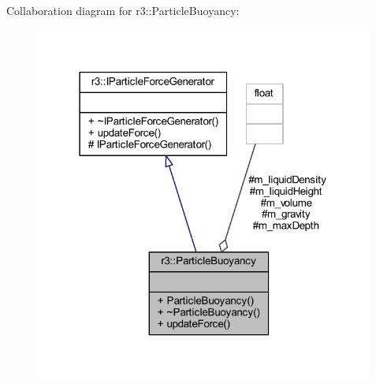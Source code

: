 Collaboration diagram for r3\+:\+:Particle\+Buoyancy\+:\nopagebreak
\begin{figure}[H]
\begin{center}
\leavevmode
\includegraphics[width=316pt]{classr3_1_1_particle_buoyancy__coll__graph}
\end{center}
\end{figure}
